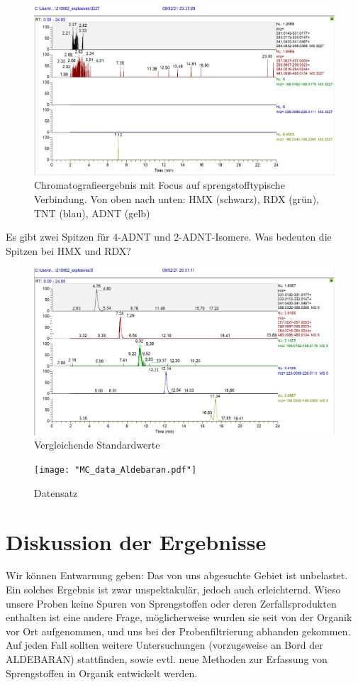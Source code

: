 \begin{figure}[htb]
\includegraphics[height=\textheight,%
                   width=\textwidth,%
                   keepaspectratio]{"Explosives_3227_SampleW1.PNG"}
\caption{Chromatografieergebnis mit Focus auf sprengstofftypische Verbindung. Von oben nach unten: HMX (schwarz), RDX (grün), TNT (blau), ADNT (gelb)}
\end{figure}
Es gibt zwei Spitzen für 4-ADNT und 2-ADNT-Isomere.
Was bedeuten die Spitzen bei HMX und RDX?

\begin{figure}[htb]
\includegraphics[height=\textheight,%
                   width=\textwidth,%
                   keepaspectratio]{"Explosives_5ppb.PNG"}
\caption{Vergleichende Standardwerte}
\end{figure}
\begin{figure}[htb]
\texttt{[image: "MC\_data\_Aldebaran.pdf"]}
\caption{Datensatz}
\end{figure}
\section[Diskussion der Ergebnisse]{Diskussion der Ergebnisse}
Wir können Entwarnung geben: Das von uns abgesuchte Gebiet ist unbelastet. Ein
solches Ergebnis ist zwar unspektakulär, jedoch auch erleichternd. Wieso 
unsere Proben keine Spuren von Sprengstoffen oder deren Zerfallsprodukten 
enthalten ist eine andere Frage, möglicherweise wurden sie seit %
von der Organik vor Ort aufgenommen, und uns bei der Probenfiltrierung
abhanden gekommen. Auf jeden Fall sollten weitere Untersuchungen (vorzugsweise
an Bord der ALDEBARAN) stattfinden, sowie evtl. neue Methoden zur Erfassung
von Sprengstoffen in Organik entwickelt werden.

